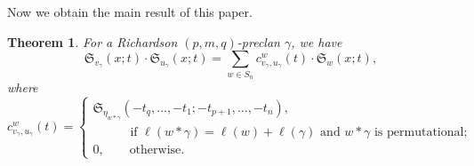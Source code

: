 \documentclass[12pt,reqno]{amsart}
\numberwithin{equation}{section}
\newtheorem{theorem}{Theorem}[section]
\theoremstyle{definition}
\begin{document}
Now we obtain the main result of this paper. 

\begin{theorem}\label{thm:maindouble}
For a Richardson $(p,m,q)$-preclan $\gamma$, we have 
$$
\mathfrak{S}_{v_\gamma}(x;t)\cdot
\mathfrak{S}_{u_\gamma}(x;t)
=\sum_{w\in S_n} c_{v_\gamma,u_\gamma}^w(t)\cdot \mathfrak{S}_w(x;t),$$
where 
$$c_{v_\gamma,u_\gamma}^w(t)
=\begin{cases}
\mathfrak{S}_{\eta_{w*\gamma}}(-t_q,\ldots,-t_1;-t_{p+1},\ldots,-t_n),\\
\qquad \quad \text{if $\ell(w*\gamma)=\ell(w)+\ell(\gamma)$ and $w*\gamma$ is permutational};\\[1ex]
0, \qquad \text{otherwise}. 
\end{cases}
$$
\end{theorem}
\end{document}
